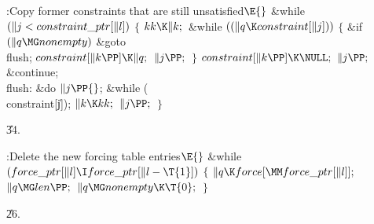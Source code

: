 \B{}:Copy former constraints that are still unsatisfied\X${}\E{}$\6
\&{while} ${}(\|j<\\{constraint\_ptr}[\|l]){}$\5
${}\{{}$\1\6
${}\\{kk}\K\|k;{}$\6
\&{while} ${}((\|q\K\\{constraint}[\|j])){}$\5
${}\{{}$\1\6
\&{if} ${}(\|q\MG\\{nonempty}){}$\1\5
\&{goto} \\{flush};\2\6
${}\\{constraint}[\|k\PP]\K\|q;{}$\6
${}\|j\PP;{}$\6
\4${}\}{}$\2\6
${}\\{constraint}[\|k\PP]\K\NULL;{}$\6
${}\|j\PP;{}$\6
\&{continue};\6
\4\\{flush}:\5
\&{do}\5
${}\|j\PP{}$;\5
\5
\&{while} (\\{constraint}[\|j]);\6
${}\|k\K\\{kk};{}$\6
${}\|j\PP;{}$\6
\4${}\}{}$\2\par
\U34.\fi

\B{}:Delete the new forcing table entries\X${}\E{}$\6
\&{while} ${}(\\{force\_ptr}[\|l]\I\\{force\_ptr}[\|l-\T{1}]){}$\5
${}\{{}$\1\6
${}\|q\K\\{force}[\MM\\{force\_ptr}[\|l]];{}$\6
${}\|q\MG\\{len}\PP;{}$\6
${}\|q\MG\\{nonempty}\K\T{0};{}$\6
\4${}\}{}$\2\par
\U26.\fi

